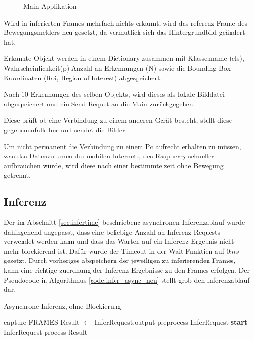 \vspace{1cm}
\begin{figure}[H]
    \centering
        
    \caption{Main Applikation}
    \label{fig:flowchart_appl}
\end{figure}
\vspace{1cm}

Wird in inferierten Frames mehrfach nichts 
erkannt, wird das referenz Frame des 
Bewegungsmelders neu gesetzt, 
da vermutlich sich das Hintergrundbild 
geändert hat.

Erkannte Objekt werden in einem Dictionary zusammen 
mit Klassenname (cls), Wahrscheinlichkeit(p)
Anzahl an Erkennungen (N) sowie die Bounding 
Box Koordinaten (Roi, Region of Interest) 
abgespeichert.

Nach 10 Erkennungen des selben Objekts, wird dieses 
als lokale Bilddatei abgespeichert und ein 
Send-Requst an die Main zurückgegeben.

Diese prüft ob eine Verbindung zu einem 
anderen Gerät besteht, stellt diese gegebenenfalls her 
und sendet die Bilder.

Um nicht permanent die Verbindung zu einem Pc aufrecht erhalten 
zu müssen, was das Datenvolumen des mobilen Internets, des 
Raspberry schneller aufbrauchen würde, wird diese nach einer 
bestimmte zeit ohne Bewegung getrennt.


\subsection*{Inferenz}

Der im Abschnitt \ref{sec:infertime} beschriebene asynchronen
Inferenzablauf wurde dahingehend angepasst, dass eine beliebige Anzahl 
an Inferenz Requests verwendet werden kann 
und dass das Warten auf ein Inferenz Ergebnis
nicht mehr blockierend ist.
Dafür wurde der Timeout in der Wait-Funktion auf 
$0ms$ gesetzt.
Durch vorheriges abspeichern der jeweiligen zu 
inferierenden Frames, kann eine richtige zuordnung 
der Inferenz Ergebnisse zu den Frames erfolgen.
Der Pseudocode in Algorithmus \ref{code:infer_async_neu} stellt
grob den Inferenzablauf dar.

\begin{algorithm}[H]
    \caption{Asynchrone Inferenz, ohne Blockierung}
    \label{code:infer_async_neu}
    \begin{algorithmic}
    \WHILE{\TRUE}
    \STATE capture FRAMES
                \STATE Result $\leftarrow$ InferRequest.output
            \ENDIF
                \STATE preprocess InferRequest
                \STATE \textbf{start} InferRequest
            \ENDIF
                \STATE process Result
            \ENDIF
        \ENDFOR
    \ENDWHILE
    \end{algorithmic}
\end{algorithm}    





